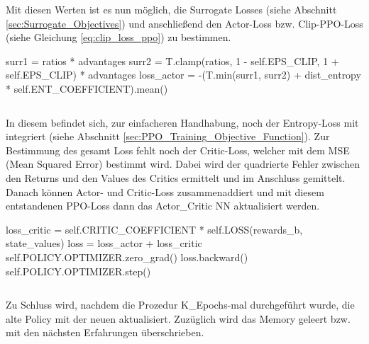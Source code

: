 \begin{lstlisting}[caption=Bestimmung der Ratios und Advantages, label=code:Bestimmung_Ratio_Advantages]
\end{lstlisting}
Mit diesen Werten ist es nun möglich, die Surrogate Losses (siehe Abschnitt \ref{sec:Surrogate_Objectives}) und anschließend den Actor-Loss bzw. Clip-PPO-Loss (siehe Gleichung \ref{eq:clip_loss_ppo}) zu bestimmen.
\begin{python}
	surr1 = ratios * advantages
	surr2 = T.clamp(ratios, 1 - self.EPS_CLIP, 1 + self.EPS_CLIP) * advantages
	loss_actor = -(T.min(surr1, surr2) + dist_entropy * self.ENT_COEFFICIENT).mean()
\end{python}
\begin{lstlisting}[caption=Bestimmung der Surrogate Losses, label=code:Bestimmung_Surrogate_Losses]
\end{lstlisting}
In diesem befindet sich, zur einfacheren Handhabung, noch der Entropy-Loss mit integriert (siehe Abschnitt \ref{sec:PPO_Training_Objective_Function}).
Zur Bestimmung des gesamt Loss fehlt noch der Critic-Loss, welcher mit dem MSE (Mean Squared Error) bestimmt wird. Dabei wird der quadrierte Fehler zwischen den Returns und den Values des Critics ermittelt und im Anschluss gemittelt.
Danach können Actor- und Critic-Loss zusammenaddiert und mit diesem entstandenen PPO-Loss dann das Actor\_Critic NN aktualisiert werden.
\begin{python}
loss_critic = self.CRITIC_COEFFICIENT * self.LOSS(rewards_b, state_values)
loss = loss_actor + loss_critic 
self.POLICY.OPTIMIZER.zero_grad()
loss.backward()
self.POLICY.OPTIMIZER.step()
\end{python}
\begin{lstlisting}[caption=Bestimmung des PPO-Losses \& Update der Netze, label=code:Bestimmung_PPO_Losses_update_NN]
\end{lstlisting}
Zu Schluss wird, nachdem die Prozedur K\_Epochs-mal durchgeführt wurde, die alte Policy mit der neuen aktualisiert. Zuzüglich wird das Memory geleert bzw. mit den nächsten Erfahrungen überschrieben.

